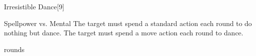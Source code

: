 \begin{spellsection}{Irresistible Dance}[9]
    \begin{spellheader}
    \end{spellheader}
    \begin{spellcontent}
        \begin{spelltargetinginfo}
        \end{spelltargetinginfo}
        \begin{spelleffects}
            \begin{spellattack}{Spellpower vs. Mental}
                \spellsuccess The target must spend a standard action each round to do nothing but dance.
                \spellfailure The target must spend a move action each round to dance.
            \end{spellattack}
             rounds
        \end{spelleffects}
    \end{spellcontent}
    \begin{spellfooter}
        \miscastrandom
    \end{spellfooter}
\end{spellsection}



